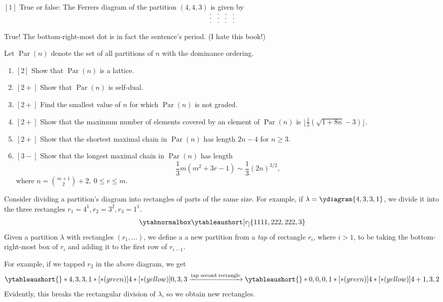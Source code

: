 \documentclass{article}
\DeclareMathOperator{\Par}{Par}
\begin{document}
\begin{exercise}
    $[1]$
    True or false: The Ferrers diagram of the partition $(4,4,3)$ is given by
    \[
        \begin{matrix}
            . & . & . & . \\
            . & . & . & . \\
            . & . & . & .
        \end{matrix}
    \]
\end{exercise}

True! The bottom-right-most dot is in fact the sentence's period. (I hate this book!)

\begin{exercise}
    Let $\Par(n)$ denote the set of all partitions of $n$ with the dominance ordering.
    \begin{enumerate}[label=(\alph*)]
        \item $[2]$ Show that $\Par(n)$ is a lattice.
        \item $[2+]$ Show that $\Par(n)$ is self-dual.
        \item $[2+]$ Find the smallest value of $n$ for which $\Par(n)$ is not graded.
        \item $[2+]$ Show that the maximum number of elements covered by an element of $\Par(n)$ is $\lfloor \frac{1}{2}(\sqrt{1+8n}-3)\rfloor$.
        \item $[2+]$ Show that the shortest maximal chain in $\Par(n)$ has length $2n-4$ for $n \geq 3$.
        \item $[3-]$ Show that the longest maximal chain in $\Par(n)$ has length
            \[
                \frac{1}{3}m(m^2+3r-1) \sim \frac{1}{3}(2n)^{3/2},
            \]
            where $n = \binom{m+1}{2} + 2,\:0 \leq r \leq m$.
    \end{enumerate}
\end{exercise}

Consider dividing a partition's diagram into rectangles of parts of the same size. For example, if $\lambda = \ydiagram{4,3,3,1}$, we divide it into the three rectangles $r_1 = 4^1, r_2 = 3^2, r_3 = 1^1$.
\[
    \ytabnormalbox
    \ytableaushort[r_]{1111,222,222,3}
\]
Given a partition $\lambda$ with rectangles $(r_1, \ldots)$, we define a a new partition from a \textit{tap} of rectangle $r_i$, where $i > 1$, to be taking the bottom-right-most box of $r_i$ and adding it to the first row of $r_{i-1}$.

For example, if we tapped $r_2$ in the above diagram, we get
\[
    \ytableaushort{}*{4,3,3,1}*[*(green)]{4}*[*(yellow)]{0,3,3}
    \xrightarrow{\text{tap second rectangle}} 
    \ytableaushort{}*{0,0,0,1}*[*(green)]{4}*[*(yellow)]{4+1,3,2}
\]
Evidently, this breaks the rectangular division of $\lambda$, so we obtain new rectangles.
\end{document}
